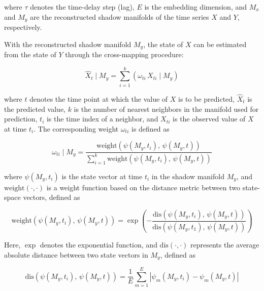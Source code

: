 \documentclass[authoryear,preprint,review,12pt]{elsarticle}
\begin{document}
\noindent where $\tau$ denotes the time-delay step (lag), $E$ is the embedding dimension, and $M_{x}$ and $M_{y}$ are the reconstructed shadow manifolds of the time series $X$ and $Y$, respectively.

With the reconstructed shadow manifold $M_{y}$, the state of $X$ can be estimated from the state of $Y$ through the cross-mapping procedure:

\begin{equation}\label{eq_cross_mapping}
\hat{X}_t \mid M_y = \sum_{i=1}^k \left( \omega_{ti} \, X_{ti} \mid M_y \right)
\end{equation}

\noindent where $t$ denotes the time point at which the value of $X$ is to be predicted, $\hat{X}_t$ is the predicted value, $k$ is the number of nearest neighbors in the manifold used for prediction, $t_i$ is the time index of a neighbor, and $X_{ti}$ is the observed value of $X$ at time $t_i$. The corresponding weight $\omega_{ti}$ is defined as

\begin{equation}\label{eq_ccm_weight}
\omega_{ti} \mid M_y = \frac{ \mathrm{weight} \left( \psi(M_y, t_i),\, \psi(M_y, t) \right) }{ \sum_{i=1}^{k} \mathrm{weight} \left( \psi(M_y, t_i),\, \psi(M_y, t) \right) }
\end{equation}

\noindent where $\psi(M_y, t_i)$ is the state vector at time $t_i$ in the shadow manifold $M_y$, and $\mathrm{weight}(\cdot,\cdot)$ is a weight function based on the distance metric between two state-space vectors, defined as

\begin{equation}\label{eq_ccm_weight_fun}
\mathrm{weight} \left( \psi(M_y, t_i),\, \psi(M_y, t) \right) =
\exp \left( - \frac{ \mathrm{dis} \left( \psi(M_y, t_i),\, \psi(M_y, t) \right) }{ \mathrm{dis} \left( \psi(M_y, t_1),\, \psi(M_y, t) \right) } \right)
\end{equation}

\noindent Here, $\exp$ denotes the exponential function, and $\mathrm{dis}(\cdot,\cdot)$ represents the average absolute distance between two state vectors in $M_y$, defined as

\begin{equation}\label{eq_ccm_distance}
\mathrm{dis} \left( \psi(M_y, t_i),\, \psi(M_y, t) \right) = \frac{1}{E} \sum_{m=1}^{E} \left| \psi_m(M_y, t_i) - \psi_m(M_y, t) \right|
\end{equation}
\end{document}
